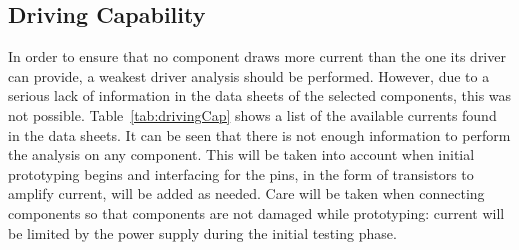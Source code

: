 \subsection{Driving Capability}

In order to ensure that no component draws more current than the one its driver can provide, a weakest driver analysis should be performed.  However, due to a serious lack of information in the data sheets of the selected components, this was not possible.  Table~\ref{tab:drivingCap} shows a list of the available currents found in the data sheets.  It can be seen that there is not enough information to perform the analysis on any component.  This will be taken into account when initial prototyping begins and interfacing for the pins, in the form of transistors to amplify current, will be added as needed.  Care will be taken when connecting components so that components are not damaged while prototyping: current will be limited by the power supply during the initial testing phase.

